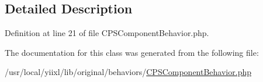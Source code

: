 \subsection{Detailed Description}


Definition at line 21 of file CPSComponentBehavior.php.



The documentation for this class was generated from the following file:\begin{DoxyCompactItemize}
\item 
/usr/local/yiixl/lib/original/behaviors/\hyperlink{CPSComponentBehavior_8php}{CPSComponentBehavior.php}\end{DoxyCompactItemize}
